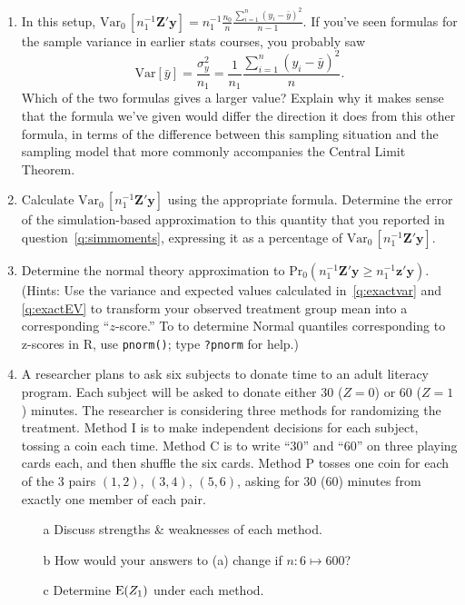 \documentclass{article}
\begin{document}
\begin{enumerate}
\item In this setup, $\mathrm{Var}_{0}\, [n_{1}^{-1}\mathbf{Z}'\mathbf{y}]  = n_{1}^{-1}
  \frac{n_{0}}{n} \frac{\sum_{i=1}^{n} (y_{i} - \bar y)^{2}}{n-1} $.
  If you've seen formulas for the sample variance in earlier stats
  courses, you probably saw
  $$
  \mathrm{Var} \left[\bar{y}\right] = \frac{\sigma_{y}^{2}}{n_{1}} = \frac{1}{n_{1}}
  \frac{\sum_{i=1}^{n} (y_{i} - \bar y)^{2}}{n} .
  $$
Which of the two formulas gives a larger value?  Explain why it makes
sense that the formula we've given would differ the direction it does
from this other formula, in terms of the difference between this
sampling situation and the sampling model that more commonly
accompanies the Central Limit Theorem.
\item Calculate $\mathrm{Var}_{0}\, [n_{1}^{-1}\mathbf{Z}'\mathbf{y}]$ using the appropriate
  formula.   Determine the error of the simulation-based
  approximation to this quantity that you reported in question~\ref{q:simmoments},
  expressing it as a percentage of $\mathrm{Var}_{0}\,[ n_{1}^{-1}\mathbf{Z}'\mathbf{y}]$. \label{q:exactvar}
\item Determine the normal theory approximation to
  $\mathrm{Pr}_{0}(n_{1}^{-1}\mathbf{Z}'\mathbf{y} \geq
  n_{1}^{-1}\mathbf{z}'\mathbf{y} ) $.  (Hints: Use the variance and
  expected values calculated in~\ref{q:exactvar} and \ref{q:exactEV} to transform your
  observed treatment group mean into a corresponding ``$z$-score.'' 
  To to determine Normal quantiles corresponding to z-scores in R, use
  \texttt{pnorm()}; type \texttt{?pnorm} for help.)
\item %
A researcher plans to ask six subjects to donate time to an adult
literacy program. Each subject will be asked to donate either 30
($Z=0$) or 60 ($Z=1$)
minutes. The researcher is considering three methods for randomizing
the treatment. Method I is to make independent decisions for each
subject, tossing a coin each time. Method C is to
write ``30'' and ``60'' on three playing cards each, and then shuffle
the six cards. Method P tosses one coin for each of the 3 pairs
$(1,2)$, $(3,4)$, $(5,6)$, asking for 30 (60) minutes from exactly one
member of each pair. 
  \begin{minipage}{.45\linewidth}
\begin{itemize}
\item[a] Discuss strengths \& weaknesses of each method.
\item[b] How would your answers to (a) change if $n: 6 \mapsto 600$?
\item[c] Determine $\mathrm{E}(  Z_{1} )$  under each method.

\end{itemize}
\end{minipage}
\end{enumerate}
\end{document}

